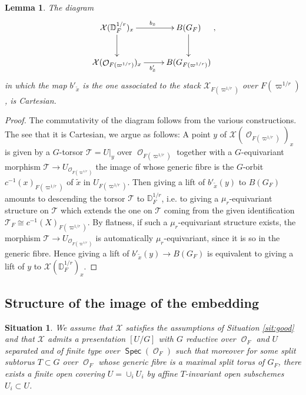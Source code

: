 \documentclass{article}
\DeclareMathOperator{\CO}{\mathcal{O}}
\DeclareMathOperator{\Spec}{\mathsf{Spec}}
\newcommand{\CT}{{\mathcal T}}
\newcommand{\CX}{{\mathcal X}}
\newcommand{\Dr}[1][r]{\mathbb{D}_F^{1/#1}}
\theoremstyle{definition}
\theoremstyle{plain}
\newtheorem{lemma}[definition]{Lemma}
\newtheorem{situation}[definition]{Situation}
\begin{document}
\begin{lemma} \label{bBC}
    The diagram
    \begin{equation*}
        \xymatrix{
            \CX(\Dr)_x \ar[r]^{b_{\tilde x}} \ar[d] & B(G_F) \ar[d] \\
            \CX(\CO_{F(\varpi^{1/r})})_x \ar[r]_{b'_{\tilde x}} & B(G_{F(\varpi^{1/r})})
        },
    \end{equation*}
    in which the map $b'_{\tilde x}$ is the one associated to the stack $\CX_{F(\varpi^{1/r})}$ over ${F(\varpi^{1/r})}$, is Cartesian.
\end{lemma}
\begin{proof}
    The commutativity of the diagram follows from the various constructions. The see that it is Cartesian, we argue as follows: A point $y$ of $\CX(\CO_{F(\varpi^{1/r})})_x$ is given by a $G$-torsor $\CT=U|_y$ over $\CO_{F(\varpi^{1/r})}$ together with a $G$-equivariant morphism $\CT \to U_{\CO_{F(\varpi^{1/r})}}$ the image of whose generic fibre is the $G$-orbit $c^{-1}(x)_{F(\varpi^{1/r})}$ of $\tilde x$ in $U_{F(\varpi^{1/r})}$. Then giving a lift of $b'_{\tilde x}(y)$ to $B(G_F)$ amounts to descending the torsor $\CT$ to $\Dr$, i.e. to giving a $\mu_r$-equivariant structure on $\CT$ which extends the one on $\CT$ coming from the given identification $\CT_F \cong c^{-1}(X)_{F(\varpi^{1/r})}$. By flatness, if such a $\mu_r$-equivariant structure exists, the morphism $\CT \to U_{\CO_{F(\varpi^{1/r})}}$ is automatically $\mu_r$-equivariant, since it is so in the generic fibre. Hence giving a lift of $b'_{\tilde x}(y) \to B(G_F)$ is equivalent to giving a lift of $y$ to $\CX(\Dr)_x$.   
\end{proof}

\subsection{Structure of the image of the embedding}
\begin{situation} \label{AffineCoverSit}
    We assume that $\CX$ satisfies the assumptions of Situation \ref{sit:good} and that $\CX$ admits a presentation $[U/G]$ with $G$ reductive over $\CO_F$ and $U$ separated and of finite type over $\Spec(\CO_F)$ such that moreover for some split subtorus $T \subset G$ over $\CO_F$ whose generic fibre is a maximal split torus of $G_F$, there exists a finite open covering $U=\cup_i U_i$ by affine $T$-invariant open subschemes $U_i \subset U$.
\end{situation}
\end{document}
